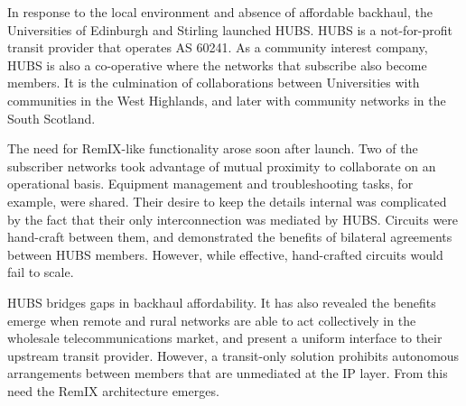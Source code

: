 In response to the local environment and absence of affordable backhaul, the
Universities of Edinburgh and Stirling launched HUBS. HUBS is a not-for-profit
transit provider that operates \ac{AS} 60241. As a community interest company,
HUBS is also a co-operative where the networks that subscribe also become
members. It is the culmination of collaborations between Universities with
communities in the West Highlands, and later with community networks in the
South Scotland.

The need for RemIX-like functionality arose soon after launch. Two of the
subscriber networks took advantage of mutual proximity to collaborate on an
operational basis. Equipment management and troubleshooting tasks, for example,
were shared. Their desire to keep the details internal was complicated by the
fact that their only interconnection was mediated by HUBS. Circuits were
hand-craft between them, and demonstrated the benefits of bilateral agreements
between HUBS members. However, while effective, hand-crafted circuits would
fail to scale.

HUBS bridges gaps in backhaul affordability. It has also revealed the benefits
emerge when remote and rural networks are able to act collectively in the
wholesale telecommunications market, and present a uniform interface to their
upstream transit provider. However, a transit-only solution prohibits autonomous
arrangements between members that are unmediated at the IP layer. From this need
the RemIX architecture emerges.


